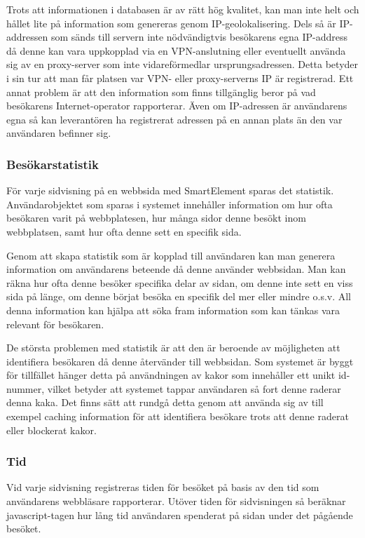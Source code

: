 Trots att informationen i databasen är av rätt hög kvalitet, kan man inte helt och hållet lite på information som genereras genom IP-geolokalisering. Dels så är IP-addressen som sänds till servern inte nödvändigtvis besökarens egna IP-address då denne kan vara uppkopplad via en VPN-anslutning eller eventuellt använda sig av en proxy-server som inte vidareförmedlar ursprungsadressen. Detta betyder i sin tur att man får platsen var VPN- eller proxy-serverns IP är registrerad. Ett annat problem är att den information som finns tillgänglig beror på vad besökarens Internet-operator rapporterar. Även om IP-adressen är användarens egna så kan leverantören ha registrerat adressen på en annan plats än den var användaren befinner sig. 

\subsubsection{Besökarstatistik}

För varje sidvisning på en webbsida med SmartElement sparas det statistik. Användarobjektet som sparas i systemet innehåller information om hur ofta besökaren varit på webbplatesen, hur många sidor denne besökt inom webbplatsen, samt hur ofta denne sett en specifik sida.

Genom att skapa statistik som är kopplad till användaren kan man generera information om användarens beteende då denne använder webbsidan. Man kan räkna hur ofta denne besöker specifika delar av sidan, om denne inte sett en viss sida på länge, om denne börjat besöka en specifik del mer eller mindre o.s.v. All denna information kan hjälpa att söka fram information som kan tänkas vara relevant för besökaren.

De största problemen med statistik är att den är beroende av möjligheten att identifiera besökaren då denne återvänder till webbsidan. Som systemet är byggt för tillfället hänger detta på användningen av kakor som innehåller ett unikt id-nummer, vilket betyder att systemet tappar användaren så fort denne raderar denna kaka. Det finns sätt att rundgå detta genom att använda sig av till exempel caching information för att identifiera besökare trots att denne raderat eller blockerat kakor. \citep{ashkanblog}



\subsubsection{Tid}

Vid varje sidvisning registreras tiden för besöket på basis av den tid som användarens webbläsare rapporterar. Utöver tiden för sidvisningen så beräknar javascript-tagen hur lång tid användaren spenderat på sidan under det pågående besöket.


